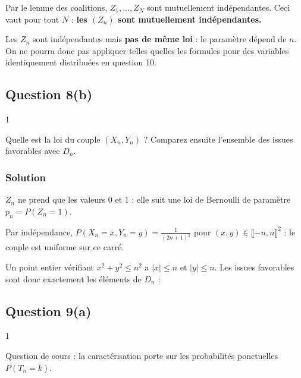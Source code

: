 \documentclass[11pt,a4paper]{article}
\providecommand{\llbracket}{\lBrack}
\providecommand{\rrbracket}{\rBrack}
\newcommand{\equationajustee}[1]{%
  \sbox{\boiteequation}{$\displaystyle #1$}%
  \ifdim\wd\boiteequation>\linewidth
    \[\resizebox{\linewidth}{!}{\usebox{\boiteequation}}\]%
  \else
    \[#1\]%
  \fi}
\begin{document}
Par le lemme des coalitions, \(Z_1,\dots,Z_N\) sont mutuellement indépendantes. Ceci vaut pour tout \(N\) : \textbf{les \((Z_n)\) sont mutuellement indépendantes.}

\begin{piege}

Les \(Z_n\) sont indépendantes mais \textbf{pas de même loi} : le paramètre dépend de \(n\). On ne pourra donc pas appliquer telles quelles les formules pour des variables identiquement distribuées en question 10.

\end{piege}

\hypertarget{question-8b}{%
\subsection{Question 8(b)}\label{question-8b}}

\begin{indication}{1}

Quelle est la loi du couple \((X_n,Y_n)\) ? Comparez ensuite l'ensemble des issues favorables avec \(D_n\).

\end{indication}

\hypertarget{solution-17}{%
\subsubsection{Solution}\label{solution-17}}

\(Z_n\) ne prend que les valeurs \(0\) et \(1\) : elle suit une loi de Bernoulli de paramètre \(p_n=P(Z_n=1)\).

Par indépendance, \(P(X_n=x,Y_n=y)=\frac{1}{(2n+1)^2}\) pour \((x,y)\in\llbracket-n,n\rrbracket^2\) : le couple est uniforme sur ce carré.

Un point entier vérifiant \(x^2+y^2\leqslant n^2\) a \(|x|\leqslant n\) et \(|y|\leqslant n\). Les issues favorables sont donc exactement les éléments de \(D_n\) :

\equationajustee{\boxed{Z_n\hookrightarrow\mathcal B\Big(\frac{\operatorname{Card}(D_n)}{(2n+1)^2}\Big).}}

\hypertarget{question-9a}{%
\subsection{Question 9(a)}\label{question-9a}}

\begin{indication}{1}

Question de cours : la caractérisation porte sur les probabilités ponctuelles \(P(T_n=k)\).

\end{indication}
\end{document}
